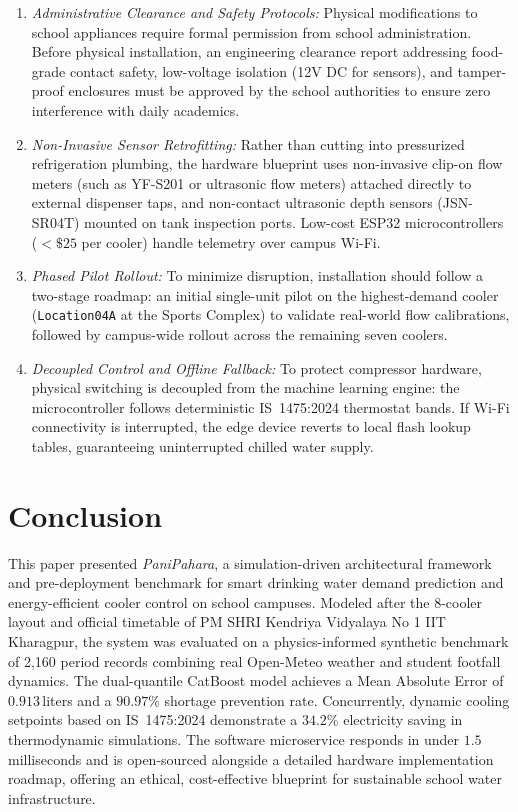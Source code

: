 \documentclass[conference]{IEEEtran}
\begin{document}
\begin{enumerate}
    \item \textit{Administrative Clearance and Safety Protocols:} Physical modifications to school appliances require formal permission from school administration. Before physical installation, an engineering clearance report addressing food-grade contact safety, low-voltage isolation (12V DC for sensors), and tamper-proof enclosures must be approved by the school authorities to ensure zero interference with daily academics.
    \item \textit{Non-Invasive Sensor Retrofitting:} Rather than cutting into pressurized refrigeration plumbing, the hardware blueprint uses non-invasive clip-on flow meters (such as YF-S201 or ultrasonic flow meters) attached directly to external dispenser taps, and non-contact ultrasonic depth sensors (JSN-SR04T) mounted on tank inspection ports. Low-cost ESP32 microcontrollers ($< \$25$ per cooler) handle telemetry over campus Wi-Fi.
    \item \textit{Phased Pilot Rollout:} To minimize disruption, installation should follow a two-stage roadmap: an initial single-unit pilot on the highest-demand cooler (\texttt{Location04A} at the Sports Complex) to validate real-world flow calibrations, followed by campus-wide rollout across the remaining seven coolers.
    \item \textit{Decoupled Control and Offline Fallback:} To protect compressor hardware, physical switching is decoupled from the machine learning engine: the microcontroller follows deterministic IS~1475:2024 thermostat bands. If Wi-Fi connectivity is interrupted, the edge device reverts to local flash lookup tables, guaranteeing uninterrupted chilled water supply.
\end{enumerate}

\section{Conclusion}
This paper presented \textit{PaniPahara}, a simulation-driven architectural framework and pre-deployment benchmark for smart drinking water demand prediction and energy-efficient cooler control on school campuses. Modeled after the 8-cooler layout and official timetable of PM SHRI Kendriya Vidyalaya No 1 IIT Kharagpur, the system was evaluated on a physics-informed synthetic benchmark of 2,160 period records combining real Open-Meteo weather and student footfall dynamics. The dual-quantile CatBoost model achieves a Mean Absolute Error of $0.913$\,liters and a $90.97\%$ shortage prevention rate. Concurrently, dynamic cooling setpoints based on IS~1475:2024 demonstrate a $34.2\%$ electricity saving in thermodynamic simulations. The software microservice responds in under $1.5$\,milliseconds and is open-sourced alongside a detailed hardware implementation roadmap, offering an ethical, cost-effective blueprint for sustainable school water infrastructure.

\balance



\end{document}
